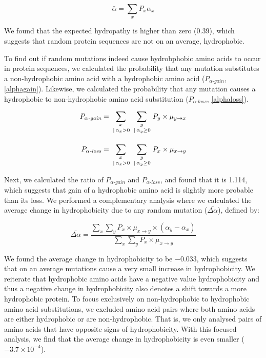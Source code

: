 \documentclass[12pt,a4paper]{article}
\begin{document}
\begin{equation}
\bar{\alpha} = \sum_{x} P_x \alpha_x
\label{expHydropathy}
\end{equation}


We found that the expected hydropathy is higher than zero ($0.39$), which suggests that random protein sequences are not on an average, hydrophobic.
 
To find out if random mutations indeed cause hydrobphobic amino acids to occur in protein sequences, we calculated the probability that any mutation substitutes a non-hydrophobic amino acid with a hydrophobic amino acid ($P_{\alpha\textit{-gain}}$, \autoref{alphagain}). Likewise, we calculated the probability that any mutation causes a hydrophobic to non-hydrophobic amino acid substitution ($P_{\alpha\textit{-loss}}$, \autoref{alphaloss}).  

\begin{align}
P_{\alpha\textit{-gain}} & = \sum_{\genfrac{}{}{0pt}{1}{x}{\,|\,\alpha_x>0}} \sum_{\genfrac{}{}{0pt}{1}{y}{\,|\,\alpha_y \geq 0}} P_y \times \mu_{y\to x}\label{alphagain}\\[1em]
%
P_{\alpha\textit{-loss}} &= \sum_{\genfrac{}{}{0pt}{1}{x}{\,|\,\alpha_x>0}} \sum_{\genfrac{}{}{0pt}{1}{y}{\,|\,\alpha_y \geq 0}} P_x \times \mu_{x\to y}\label{alphaloss}
\end{align}

Next, we calculated the ratio of $P_{\alpha\textit{-gain}}$ and $P_{\alpha\textit{-loss}}$, and found that it is 1.114, which suggests that gain of a hydrophobic amino acid is slightly more probable than its loss. We performed a complementary analysis where we calculated the average change in hydrophobicity due to any random mutation ($\bar{\Delta\alpha}$), defined by:

\begin{equation}
\bar{\Delta\alpha} = \frac{\displaystyle\sum_{x} \sum_{y} P_x \times \mu_{x\to y} \times (\alpha_y - \alpha_x)}{\displaystyle\sum_{x} \sum_{y} P_x \times \mu_{x\to y}}
\end{equation}

We found the average change in hydrophobicity to be $-0.033$, which suggests that on an average mutations cause a very small increase in hydrophobicity. We reiterate that hydrophobic amino acids have a negative value hydrophobicity and thus a negative change in hydrophobicity also denotes a shift towards a more hydrophobic protein. To focus exclusively on non-hydrophobic to hydrophobic amino acid substitutions, we excluded amino acid pairs where both amino acids are either hydrophobic or are non-hydrophobic. That is, we only analysed pairs of amino acids that have opposite signs of hydrophobicity. With this focused analysis, we find that the average change in hydrophobicity is even smaller ($-3.7\times 10^{-4}$).
\end{document}
